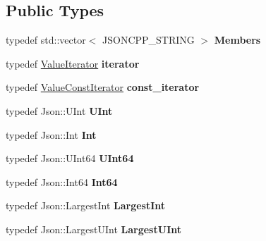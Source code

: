 \subsection*{Public Types}
\begin{DoxyCompactItemize}
\item 
typedef std\+::vector$<$ J\+S\+O\+N\+C\+P\+P\+\_\+\+S\+T\+R\+I\+NG $>$ {\bfseries Members}\hypertarget{class_json_1_1_value_a9ae9069983fc38f1928d76f9c79ac64d}{}\label{class_json_1_1_value_a9ae9069983fc38f1928d76f9c79ac64d}

\item 
typedef \hyperlink{class_json_1_1_value_iterator}{Value\+Iterator} {\bfseries iterator}\hypertarget{class_json_1_1_value_a341cdf2e01f8b3c5b7317aa2f0768c53}{}\label{class_json_1_1_value_a341cdf2e01f8b3c5b7317aa2f0768c53}

\item 
typedef \hyperlink{class_json_1_1_value_const_iterator}{Value\+Const\+Iterator} {\bfseries const\+\_\+iterator}\hypertarget{class_json_1_1_value_af92282ca92b58b320debd486afb7696a}{}\label{class_json_1_1_value_af92282ca92b58b320debd486afb7696a}

\item 
typedef Json\+::\+U\+Int {\bfseries U\+Int}\hypertarget{class_json_1_1_value_a0933d59b45793ae4aade1757c322a98d}{}\label{class_json_1_1_value_a0933d59b45793ae4aade1757c322a98d}

\item 
typedef Json\+::\+Int {\bfseries Int}\hypertarget{class_json_1_1_value_abdf7a7ff73eb130ffcab28504ffdb405}{}\label{class_json_1_1_value_abdf7a7ff73eb130ffcab28504ffdb405}

\item 
typedef Json\+::\+U\+Int64 {\bfseries U\+Int64}\hypertarget{class_json_1_1_value_a8b62564be8c087c6d18de180ff4e13e3}{}\label{class_json_1_1_value_a8b62564be8c087c6d18de180ff4e13e3}

\item 
typedef Json\+::\+Int64 {\bfseries Int64}\hypertarget{class_json_1_1_value_a1b86af9f85f0f1baa972c3319fa22695}{}\label{class_json_1_1_value_a1b86af9f85f0f1baa972c3319fa22695}

\item 
typedef Json\+::\+Largest\+Int {\bfseries Largest\+Int}\hypertarget{class_json_1_1_value_a1cbb82642ed05109b9833e49f042ece7}{}\label{class_json_1_1_value_a1cbb82642ed05109b9833e49f042ece7}

\item 
typedef Json\+::\+Largest\+U\+Int {\bfseries Largest\+U\+Int}\hypertarget{class_json_1_1_value_a6682a3684d635e03fc06ba229fa24eec}{}\label{class_json_1_1_value_a6682a3684d635e03fc06ba229fa24eec}


\end{DoxyCompactItemize}
